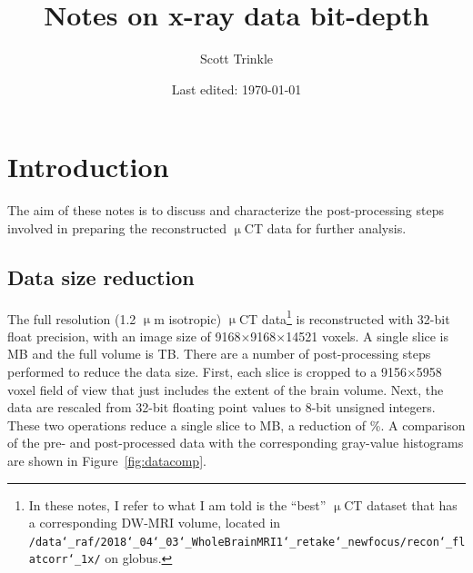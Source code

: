 \documentclass[11pt]{article}
\title{Notes on x-ray data bit-depth}
\author{Scott Trinkle}
\date{Last edited: \today}
\begin{document}
\maketitle

\section{Introduction}

The aim of these notes is to discuss and characterize the post-processing steps
involved in preparing the reconstructed $\upmu$CT data for further analysis.

\subsection{Data size reduction}
The full resolution (1.2 $\upmu$m isotropic) $\upmu$CT data\footnote{In these
  notes, I refer to what I am told is the ``best'' $\upmu$CT dataset that has a
  corresponding DW-MRI volume, located in
  \texttt{/data\char`_raf/2018\char`_04\char`_03\char`_WholeBrainMRI1\char`_retake\char`_newfocus/recon\char`_flatcorr\char`_1x/}
  on globus.}  is reconstructed with 32-bit float precision, with an image size
of 9168$\times$9168$\times$14521 voxels. A single slice is  MB
and the full volume is  TB. There are a number of post-processing
steps performed to reduce the data size. First, each slice is cropped to a
9156$\times$5958 voxel field of view that just includes the extent of the brain
volume. Next, the data are rescaled from 32-bit floating point values to
8-bit unsigned integers. These two operations reduce a single slice to  MB, a reduction of \%. A comparison of the pre- and
post-processed data with the corresponding gray-value histograms are shown in
Figure~\ref{fig:datacomp}.
\end{document}
